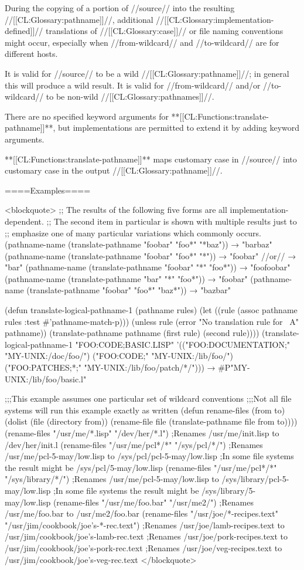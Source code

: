 During the copying of a portion of //source// into the resulting //[[CL:Glossary:pathname]]//, additional //[[CL:Glossary:implementation-defined]]// translations of //[[CL:Glossary:case]]// or file naming conventions might occur, especially when //from-wildcard// and //to-wildcard// are for different hosts.

It is valid for //source// to be a wild //[[CL:Glossary:pathname]]//; in general this will produce a wild result. It is valid for //from-wildcard// and/or //to-wildcard// to be non-wild //[[CL:Glossary:pathnames]]//.

There are no specified keyword arguments for **[[CL:Functions:translate-pathname]]**, but implementations are permitted to extend it by adding keyword arguments.

**[[CL:Functions:translate-pathname]]** maps customary case in //source// into customary case in the output //[[CL:Glossary:pathname]]//.


====Examples====

<blockquote> ;; The results of the following five forms are all implementation-dependent. ;; The second item in particular is shown with multiple results just to ;; emphasize one of many particular variations which commonly occurs. (pathname-name (translate-pathname "foobar" "foo*" "*baz")) → "barbaz" (pathname-name (translate-pathname "foobar" "foo*" "*")) → "foobar" //or// → "bar" (pathname-name (translate-pathname "foobar" "*" "foo*")) → "foofoobar" (pathname-name (translate-pathname "bar" "*" "foo*")) → "foobar" (pathname-name (translate-pathname "foobar" "foo*" "baz*")) → "bazbar"

(defun translate-logical-pathname-1 (pathname rules) (let ((rule (assoc pathname rules :test #'pathname-match-p))) (unless rule (error "No translation rule for ~A" pathname)) (translate-pathname pathname (first rule) (second rule)))) (translate-logical-pathname-1 "FOO:CODE;BASIC.LISP" '(("FOO:DOCUMENTATION;" "MY-UNIX:/doc/foo/") ("FOO:CODE;" "MY-UNIX:/lib/foo/") ("FOO:PATCHES;*;" "MY-UNIX:/lib/foo/patch/*/"))) → #P"MY-UNIX:/lib/foo/basic.l"

;;;This example assumes one particular set of wildcard conventions ;;;Not all file systems will run this example exactly as written (defun rename-files (from to) (dolist (file (directory from)) (rename-file file (translate-pathname file from to)))) (rename-files "/usr/me/*.lisp" "/dev/her/*.l") ;Renames /usr/me/init.lisp to /dev/her/init.l (rename-files "/usr/me/pcl*/*" "/sys/pcl/*/") ;Renames /usr/me/pcl-5-may/low.lisp to /sys/pcl/pcl-5-may/low.lisp ;In some file systems the result might be /sys/pcl/5-may/low.lisp (rename-files "/usr/me/pcl*/*" "/sys/library/*/") ;Renames /usr/me/pcl-5-may/low.lisp to /sys/library/pcl-5-may/low.lisp ;In some file systems the result might be /sys/library/5-may/low.lisp (rename-files "/usr/me/foo.bar" "/usr/me2/") ;Renames /usr/me/foo.bar to /usr/me2/foo.bar (rename-files "/usr/joe/*-recipes.text" "/usr/jim/cookbook/joe's-*-rec.text") ;Renames /usr/joe/lamb-recipes.text to /usr/jim/cookbook/joe's-lamb-rec.text ;Renames /usr/joe/pork-recipes.text to /usr/jim/cookbook/joe's-pork-rec.text ;Renames /usr/joe/veg-recipes.text to /usr/jim/cookbook/joe's-veg-rec.text </blockquote>

